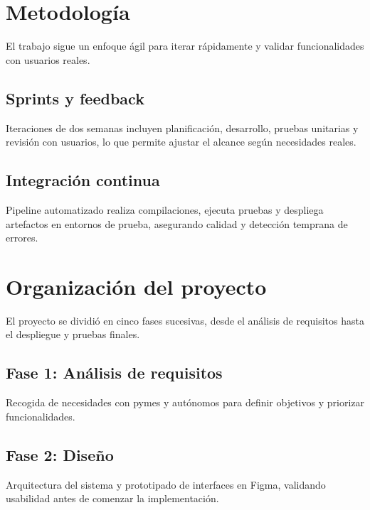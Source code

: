 \section{Metodología}
\begin{large}
El trabajo sigue un enfoque ágil para iterar rápidamente y validar funcionalidades con usuarios reales.  
\end{large}

\subsection{Sprints y feedback}
\begin{large}
Iteraciones de dos semanas incluyen planificación, desarrollo, pruebas unitarias y revisión con usuarios, lo que permite ajustar el alcance según necesidades reales.
\end{large}

\subsection{Integración continua}
\begin{large}
Pipeline automatizado realiza compilaciones, ejecuta pruebas y despliega artefactos en entornos de prueba, asegurando calidad y detección temprana de errores.
\end{large}

\section{Organización del proyecto}
\begin{large}
El proyecto se dividió en cinco fases sucesivas, desde el análisis de requisitos hasta el despliegue y pruebas finales.  
\end{large}

\subsection{Fase 1: Análisis de requisitos}
\begin{large}
Recogida de necesidades con pymes y autónomos para definir objetivos y priorizar funcionalidades.
\end{large}

\subsection{Fase 2: Diseño}
\begin{large}
Arquitectura del sistema y prototipado de interfaces en Figma, validando usabilidad antes de comenzar la implementación.
\end{large}

